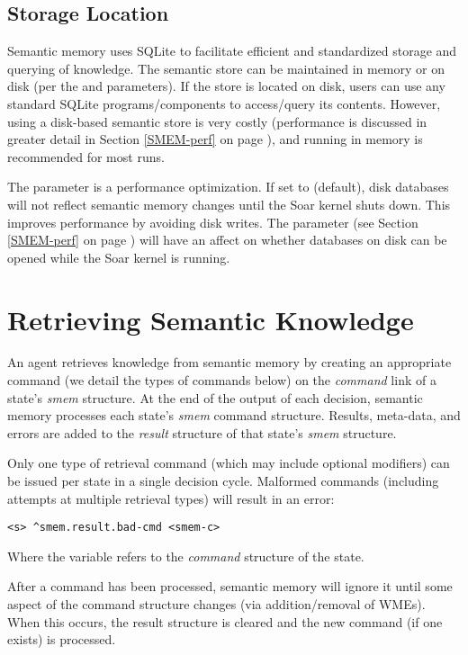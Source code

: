 \subsection{Storage Location}
Semantic memory uses SQLite to facilitate efficient and standardized storage and querying of knowledge.  
The semantic store can be maintained in memory or on disk (per the  and  parameters). 
If the store is located on disk, users can use any standard SQLite programs/components to access/query its contents.
However, using a disk-based semantic store is very costly (performance is discussed in greater detail in Section \ref{SMEM-perf} on page \pageref{SMEM-perf}), and running in memory is recommended for most runs.

The  parameter is a performance optimization. 
If set to  (default), disk databases will not reflect semantic memory changes until the Soar kernel shuts down. 
This improves performance by avoiding disk writes. 
The  parameter (see Section \ref{SMEM-perf} on page \pageref{SMEM-perf}) will have an affect on whether databases on disk can be opened while the Soar kernel is running.


\section{Retrieving Semantic Knowledge}
\label{SMEM-retrieve}

An agent retrieves knowledge from semantic memory by creating an appropriate command (we detail the types of commands below) on the \emph{command} link of a state's \emph{smem} structure. 
At the end of the output of each decision, semantic memory processes each state's \emph{smem} command structure.  
Results, meta-data, and errors are added to the \emph{result} structure of that state's \emph{smem} structure.

Only one type of retrieval command (which may include optional modifiers) can be issued per state in a single decision cycle.  
Malformed commands (including attempts at multiple retrieval types) will result in an error:

\begin{verbatim}
<s> ^smem.result.bad-cmd <smem-c>
\end{verbatim}

Where the  variable refers to the \emph{command} structure of the state.

After a command has been processed, semantic memory will ignore it until some aspect of the command structure changes (via addition/removal of WMEs).  
When this occurs, the result structure is cleared and the new command (if one exists) is processed.

